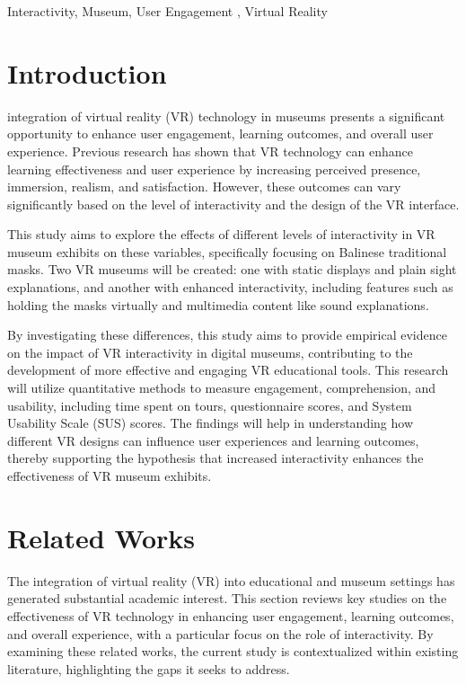\documentclass[conference]{IEEEtran}
\begin{document}
\begin{IEEEkeywords}
Interactivity, Museum, User Engagement , Virtual Reality 
\end{IEEEkeywords}

\section{Introduction}
 integration of virtual reality (VR) technology in museums presents a significant opportunity to enhance user engagement, learning outcomes, and overall user experience. Previous research has shown that VR technology can enhance learning effectiveness and user experience by increasing perceived presence, immersion, realism, and satisfaction​. However, these outcomes can vary significantly based on the level of interactivity and the design of the VR interface.

This study aims to explore the effects of different levels of interactivity in VR museum exhibits on these variables, specifically focusing on Balinese traditional masks. Two VR museums will be created: one with static displays and plain sight explanations, and another with enhanced interactivity, including features such as holding the masks virtually and multimedia content like sound explanations.

By investigating these differences, this study aims to provide empirical evidence on the impact of VR interactivity in digital museums, contributing to the development of more effective and engaging VR educational tools. This research will utilize quantitative methods to measure engagement, comprehension, and usability, including time spent on tours, questionnaire scores, and System Usability Scale (SUS) scores. The findings will help in understanding how different VR designs can influence user experiences and learning outcomes, thereby supporting the hypothesis that increased interactivity enhances the effectiveness of VR museum exhibits.

\section{Related Works}
The integration of virtual reality (VR) into educational and museum settings has generated substantial academic interest. This section reviews key studies on the effectiveness of VR technology in enhancing user engagement, learning outcomes, and overall experience, with a particular focus on the role of interactivity. By examining these related works, the current study is contextualized within existing literature, highlighting the gaps it seeks to address.
\end{document}
